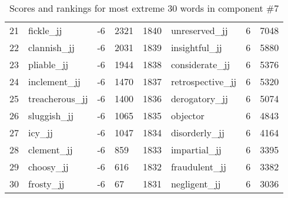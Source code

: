 \begin{table}[tbp]
\begin{tabular}{| rlr@{.}l | rlr@{.}l |}
    21 & fickle\_jj & -6 & 2321    &    1840 & unreserved\_jj & 6 & 7048 \\
    22 & clannish\_jj & -6 & 2031    &    1839 & insightful\_jj & 6 & 5880 \\
    23 & pliable\_jj & -6 & 1944    &    1838 & considerate\_jj & 6 & 5376 \\
    24 & inclement\_jj & -6 & 1470    &    1837 & retrospective\_jj & 6 & 5320 \\
    25 & treacherous\_jj & -6 & 1400    &    1836 & derogatory\_jj & 6 & 5074 \\
    26 & sluggish\_jj & -6 & 1065    &    1835 & objector & 6 & 4843 \\
    27 & icy\_jj & -6 & 1047    &    1834 & disorderly\_jj & 6 & 4164 \\
    28 & clement\_jj & -6 & 859    &    1833 & impartial\_jj & 6 & 3395 \\
    29 & choosy\_jj & -6 & 616    &    1832 & fraudulent\_jj & 6 & 3382 \\
    30 & frosty\_jj & -6 & 67    &    1831 & negligent\_jj & 6 & 3036 \\
    \hline
    \end{tabular}
    \caption{Scores and rankings for most extreme 30 words in component \#7} 
\end{table}
\clearpage
